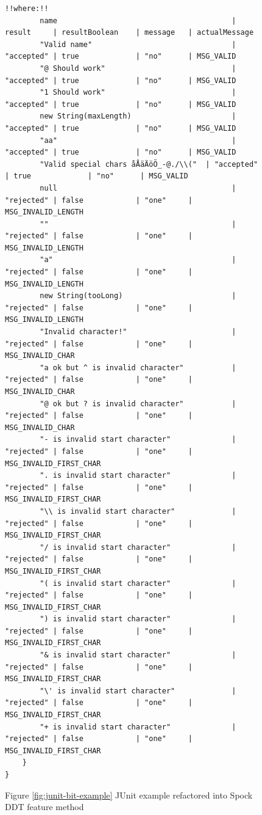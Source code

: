 \begin{figure}[H]
\begin{lstlisting}[style=javatiny]
        !!where:!!
        name                                        | result     | resultBoolean    | message   | actualMessage
        "Valid name"                                | "accepted" | true             | "no"      | MSG_VALID
        "@ Should work"                             | "accepted" | true             | "no"      | MSG_VALID
        "1 Should work"                             | "accepted" | true             | "no"      | MSG_VALID
        new String(maxLength)                       | "accepted" | true             | "no"      | MSG_VALID
        "aa"                                        | "accepted" | true             | "no"      | MSG_VALID
        "Valid special chars åÅäÄöÖ_-@./\\("  | "accepted" | true             | "no"      | MSG_VALID
        null                                        | "rejected" | false            | "one"     | MSG_INVALID_LENGTH
        ""                                          | "rejected" | false            | "one"     | MSG_INVALID_LENGTH
        "a"                                         | "rejected" | false            | "one"     | MSG_INVALID_LENGTH
        new String(tooLong)                         | "rejected" | false            | "one"     | MSG_INVALID_LENGTH
        "Invalid character!"                        | "rejected" | false            | "one"     | MSG_INVALID_CHAR
        "a ok but ^ is invalid character"           | "rejected" | false            | "one"     | MSG_INVALID_CHAR
        "@ ok but ? is invalid character"           | "rejected" | false            | "one"     | MSG_INVALID_CHAR
        "- is invalid start character"              | "rejected" | false            | "one"     | MSG_INVALID_FIRST_CHAR
        ". is invalid start character"              | "rejected" | false            | "one"     | MSG_INVALID_FIRST_CHAR
        "\\ is invalid start character"             | "rejected" | false            | "one"     | MSG_INVALID_FIRST_CHAR
        "/ is invalid start character"              | "rejected" | false            | "one"     | MSG_INVALID_FIRST_CHAR
        "( is invalid start character"              | "rejected" | false            | "one"     | MSG_INVALID_FIRST_CHAR
        ") is invalid start character"              | "rejected" | false            | "one"     | MSG_INVALID_FIRST_CHAR
        "& is invalid start character"              | "rejected" | false            | "one"     | MSG_INVALID_FIRST_CHAR
        "\' is invalid start character"             | "rejected" | false            | "one"     | MSG_INVALID_FIRST_CHAR
        "+ is invalid start character"              | "rejected" | false            | "one"     | MSG_INVALID_FIRST_CHAR
    }
}
        \end{lstlisting}
        \caption{Figure \ref{fig:junit-bit-example} JUnit example refactored into Spock DDT feature method}
        \label{fig:spock-bit-example}
    \end{figure}

